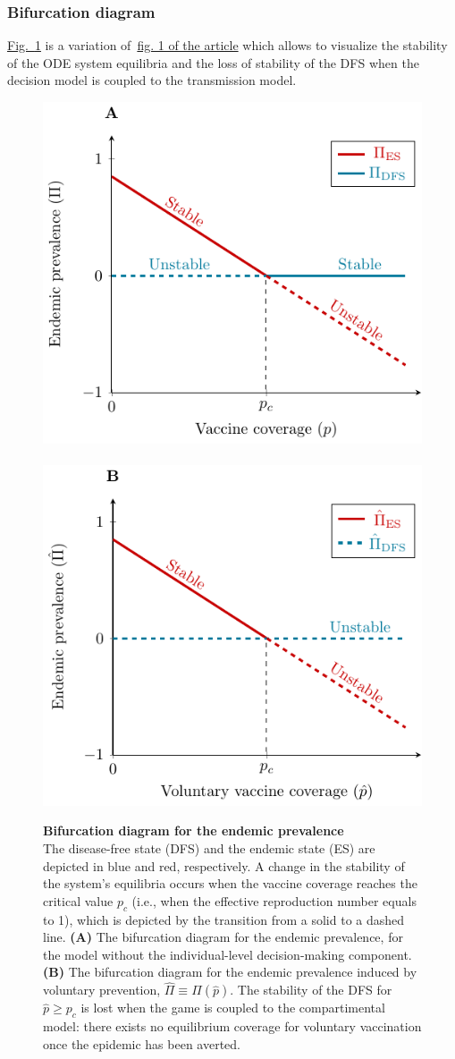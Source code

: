\newpage
\subsubsection{Bifurcation diagram}
\hyperlink{fig:Vaccine_Bifurcation}{Fig.~\ref*{fig:Vaccine_Bifurcation}} is a variation of~\hyperlink{fig:Vaccine_1}{fig. 1 of the article} which allows to visualize the stability of the ODE system equilibria and the loss of stability of the DFS when the decision model is coupled to the transmission model.

\begin{figure}[H]
	\centering	
	\includegraphics[width=0.4\linewidth]{Figures/Vaccine/TikZ_Bifurcation/TranscriticalBifurcation}
	\hspace{1cm}\
	\includegraphics[width=0.4\linewidth]{Figures/Vaccine/TikZ_Bifurcation/TranscriticalBifurcation_WithGame}
	\caption[ Bifurcation diagram for the endemic prevalence]{%
		{\bf Bifurcation diagram for the endemic prevalence}\\
	The disease-free state (DFS) and the endemic state (ES) are depicted in blue and red, respectively. A change in the stability of the system's equilibria occurs when the vaccine coverage reaches the critical value $p_c$ (i.e., when the effective reproduction number equals to 1), which is depicted by the transition from a solid to a dashed line. \textbf{(A)} The bifurcation diagram for the endemic prevalence, for the model without the individual-level decision-making component. \textbf{(B)} The bifurcation diagram for the endemic prevalence induced by voluntary prevention, $\hat{\Pi} \equiv \Pi(\hat{p})$. The stability of the DFS for $\hat{p} \geq p_c$ is lost when the game is coupled to the compartimental model: there exists no equilibrium coverage for voluntary vaccination once the epidemic has been averted.}
	\label{fig:Vaccine_Bifurcation}
\end{figure}

